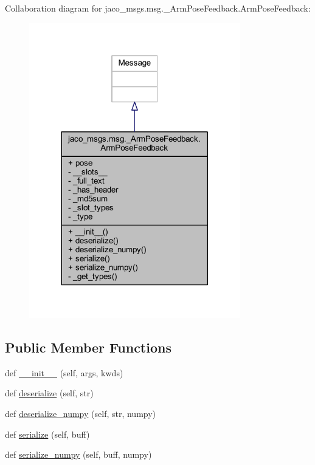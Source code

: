 Collaboration diagram for jaco\+\_\+msgs.\+msg.\+\_\+\+Arm\+Pose\+Feedback.\+Arm\+Pose\+Feedback\+:
\nopagebreak
\begin{figure}[H]
\begin{center}
\leavevmode
\includegraphics[width=260pt]{d4/d71/classjaco__msgs_1_1msg_1_1__ArmPoseFeedback_1_1ArmPoseFeedback__coll__graph}
\end{center}
\end{figure}
\subsection*{Public Member Functions}
\begin{DoxyCompactItemize}
\item 
def \hyperlink{classjaco__msgs_1_1msg_1_1__ArmPoseFeedback_1_1ArmPoseFeedback_a279364691f4ad67e80ad2c98e902e99b}{\+\_\+\+\_\+init\+\_\+\+\_\+} (self, args, kwds)
\item 
def \hyperlink{classjaco__msgs_1_1msg_1_1__ArmPoseFeedback_1_1ArmPoseFeedback_adf1c812d9109a1501616e0f033572995}{deserialize} (self, str)
\item 
def \hyperlink{classjaco__msgs_1_1msg_1_1__ArmPoseFeedback_1_1ArmPoseFeedback_a3bc6d31305a9ee2cd815b2a3ab511740}{deserialize\+\_\+numpy} (self, str, numpy)
\item 
def \hyperlink{classjaco__msgs_1_1msg_1_1__ArmPoseFeedback_1_1ArmPoseFeedback_ab93a430a77afbd0f042c5dd28ed427b7}{serialize} (self, buff)
\item 
def \hyperlink{classjaco__msgs_1_1msg_1_1__ArmPoseFeedback_1_1ArmPoseFeedback_ab56ef0265008f04e0d07163f5b5251dd}{serialize\+\_\+numpy} (self, buff, numpy)
\end{DoxyCompactItemize}
